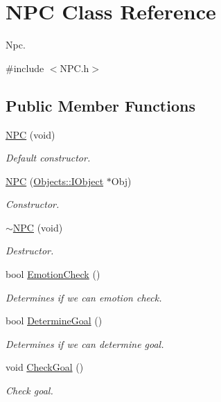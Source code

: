 \hypertarget{class_n_p_c}{\section{N\-P\-C Class Reference}
\label{class_n_p_c}
}


Npc.  




{\ttfamily \#include $<$N\-P\-C.\-h$>$}

\subsection*{Public Member Functions}
\begin{DoxyCompactItemize}
\item 
\hyperlink{class_n_p_c_af28ce051772f77e3b3c95545067d5ef5}{N\-P\-C} (void)
\begin{DoxyCompactList}\small\item\em Default constructor. \end{DoxyCompactList}\item 
\hyperlink{class_n_p_c_ad96ce7664caaec2d176bf64cac1c4df8}{N\-P\-C} (\hyperlink{class_objects_1_1_i_object}{Objects\-::\-I\-Object} $\ast$Obj)
\begin{DoxyCompactList}\small\item\em Constructor. \end{DoxyCompactList}\item 
\hyperlink{class_n_p_c_a82bd4ced6842c4ed6638e414c2b75640}{$\sim$\-N\-P\-C} (void)
\begin{DoxyCompactList}\small\item\em Destructor. \end{DoxyCompactList}\item 
bool \hyperlink{class_n_p_c_a5bd9cfaa9afa94bf3255c0ab0a6ccf1f}{Emotion\-Check} ()
\begin{DoxyCompactList}\small\item\em Determines if we can emotion check. \end{DoxyCompactList}\item 
bool \hyperlink{class_n_p_c_a40494bd49dfc0a28a71869afee79993b}{Determine\-Goal} ()
\begin{DoxyCompactList}\small\item\em Determines if we can determine goal. \end{DoxyCompactList}\item 
void \hyperlink{class_n_p_c_a30bba3999124a895a553cb93a0f094e2}{Check\-Goal} ()
\begin{DoxyCompactList}\small\item\em Check goal. \end{DoxyCompactList}\item 

\end{DoxyCompactItemize}

